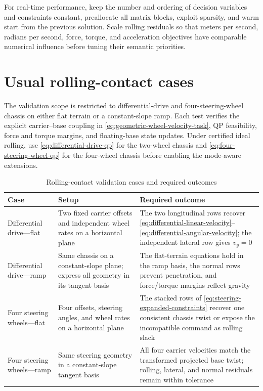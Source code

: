 \documentclass[10pt]{article}
\begin{document}
For real-time performance, keep the number and ordering of decision variables
and constraints constant, preallocate all matrix blocks, exploit sparsity, and
warm start from the previous solution. Scale rolling residuals so that meters
per second, radians per second, force, torque, and acceleration objectives have
comparable numerical influence before tuning their semantic priorities.

\section{Usual rolling-contact cases}
\label{sec:rolling-cases}

The validation scope is restricted to differential-drive and
four-steering-wheel chassis on either flat terrain or a constant-slope ramp.
Each test verifies the explicit carrier--base coupling in
\eqref{eq:geometric-wheel-velocity-task}, QP feasibility, force and torque
margins, and floating-base state updates.
Under certified ideal rolling, use \eqref{eq:differential-drive-qp} for the
two-wheel chassis and \eqref{eq:four-steering-wheel-qp} for the four-wheel
chassis before enabling the mode-aware extensions.

\begin{table}[h]
  \centering
  \caption{Rolling-contact validation cases and required outcomes}
  \label{tab:rolling-validation}
  \begin{tabular}{|C{0.22\columnwidth}|C{0.30\columnwidth}|C{0.37\columnwidth}|}
    \hline
    Case & Setup & Required outcome \\
    \hline
    Differential drive---flat & Two fixed carrier offsets and independent
      wheel rates on a horizontal plane &
      The two longitudinal rows recover
      \eqref{eq:differential-linear-velocity}--
      \eqref{eq:differential-angular-velocity}; the independent lateral row
      gives $v_y=0$ \\
    \hline
    Differential drive---ramp & Same chassis on a constant-slope plane;
      express all geometry in its tangent basis &
      The flat-terrain equations hold in the ramp basis, the normal rows prevent
      penetration, and force/torque margins reflect gravity \\
    \hline
    Four steering wheels---flat & Four offsets, steering angles, and wheel
      rates on a horizontal plane &
      The stacked rows of \eqref{eq:steering-expanded-constraints} recover one
      consistent chassis twist or expose the incompatible command as rolling
      slack \\
    \hline
    Four steering wheels---ramp & Same steering geometry in a constant-slope
      tangent basis &
      All four carrier velocities match the transformed projected base twist;
      rolling, lateral, and normal residuals remain within tolerance \\
    \hline
  \end{tabular}
\end{table}
\end{document}

